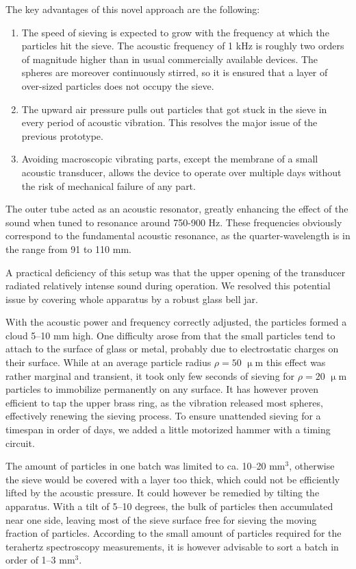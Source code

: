 The key advantages of this novel approach are the following:
\begin{enumerate}
 \item{The speed of sieving is expected to grow with the frequency at which the particles hit the sieve. The acoustic frequency of 1 kHz is roughly two orders of magnitude higher than in usual commercially available devices. The spheres are moreover continuously stirred, so it is ensured that a layer of over-sized particles does not occupy the sieve.} 
 \item{The upward air pressure pulls out particles that got stuck in the sieve in every period of acoustic vibration. This resolves the major issue of the previous prototype.} 
 \item{Avoiding macroscopic vibrating parts, except the membrane of a small acoustic transducer, allows the device to operate over multiple days without the risk of mechanical failure of any part.}
 \end{enumerate}
The outer tube acted as an acoustic resonator, greatly enhancing the effect of the sound when tuned to resonance around 750-900 Hz. These frequencies obviously correspond to the fundamental acoustic resonance, as the quarter-wavelength is in the range from 91 to 110 mm. 

A practical deficiency of this setup was that the upper opening of the transducer radiated relatively intense sound during operation. We resolved this potential issue by covering whole apparatus by a robust glass bell jar.

With the acoustic power and frequency correctly adjusted, the particles formed a cloud 5--10 mm high. One difficulty arose from that the small particles tend to attach to the surface of glass or metal, probably due to electrostatic charges on their surface. While at an average particle radius $\rho = 50$ $\upmu$m this effect was rather marginal and transient, it took only few seconds of sieving for $\rho = 20$ $\upmu$m particles to immobilize permanently on any surface. It has however proven efficient to tap the upper brass ring, as the vibration released most spheres, effectively renewing the sieving process. To ensure unattended sieving for a timespan in order of days, we added a little motorized hammer with a timing circuit. %

The amount of particles in one batch was limited to ca. 10--20 mm$^{3}$, otherwise the sieve would be covered with a layer too thick, which could not be efficiently lifted by the acoustic pressure.
It could however be remedied by tilting the apparatus. With a tilt of 5--10 degrees, the bulk of particles then accumulated near one side, leaving most of the sieve surface free for sieving the moving fraction of particles. According to the small amount of particles required for the terahertz spectroscopy measurements, it is however advisable to sort a batch in order of 1--3 mm$^{3}$.

